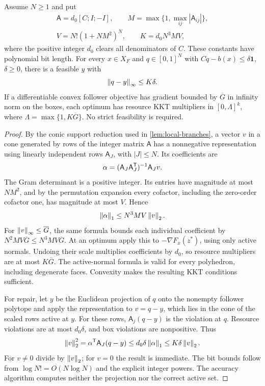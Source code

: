\begin{lemma}
\label{lem:resource-constants}
Assume $N\ge1$ and put
\begin{equation}\label{eq:integer-repair-constants}
 \begin{gathered}
 \mathsf A=d_0[C;I;-I],\qquad
 M=\max\{1,\max_{ij}|\mathsf A_{ij}|\},\\
 V=N!(1+NM^2)^N,\qquad K=d_0N^3MV,
 \end{gathered}
\end{equation}
where the positive integer $d_0$ clears all denominators of $C$.
These constants have polynomial bit length. For every $x\in X_F$
and $q\in[0,1]^N$ with $Cq-b(x)\le\delta\mathbf1$, $\delta\ge0$,
there is a feasible $y$ with
\begin{equation}\label{eq:resource-repair}
                         \left\lVert q-y\right\rVert_\infty\le K\delta.
\end{equation}
If a differentiable convex follower objective has gradient bounded by
$\overline G$ in infinity norm on the boxes, each optimum has resource
KKT multipliers in $[0,\Lambda]^k$, where
$\Lambda=\max\{1,K\overline G\}$. No strict feasibility is required.
\end{lemma}
\begin{proof}
By the conic support reduction used in \cref{lem:local-branches}, a
vector $v$ in a cone generated by rows of the integer matrix $\mathsf A$
has a nonnegative representation using linearly independent rows
$\mathsf A_J$, with $|J|\le N$. Its coefficients are
\[
 \alpha=(\mathsf A_J\mathsf A_J^{\mathsf T})^{-1}\mathsf A_Jv.
\]
The Gram determinant is a positive integer. Its entries have magnitude at
most $NM^2$, and by the permutation expansion every cofactor, including the
zero-order cofactor one, has magnitude at most $V$. Hence
\[
 \left\lVert\alpha\right\rVert_1\le N^3MV\left\lVert v\right\rVert_2.
\]
For $\left\lVert v\right\rVert_\infty\le\overline G$, the same formula bounds each
individual coefficient by $N^2MV\overline G\le N^3MV\overline G$.
At an optimum apply this to $-\nabla F_x(z^*)$, using only active
normals. Undoing their scale multiplies coefficients by $d_0$, so
resource multipliers are at most $K\overline G$. The active-normal
formula is valid for every polyhedron, including degenerate faces.
Convexity makes the resulting KKT conditions sufficient.

For repair, let $y$ be the Euclidean projection of $q$ onto the
nonempty follower polytope and apply the representation to $v=q-y$, which
lies in the cone of the scaled rows active at $y$. For these rows,
$\mathsf A_j(q-y)$ is the violation at $q$. Resource violations are at
most $d_0\delta$, and box violations are nonpositive. Thus
\[
 \left\lVert v\right\rVert_2^2=\alpha^{\mathsf T}\mathsf A_J(q-y)
 \le d_0\delta\left\lVert\alpha\right\rVert_1\le K\delta\left\lVert v\right\rVert_2.
\]
For $v\ne0$ divide by $\left\lVert v\right\rVert_2$; for $v=0$ the result is immediate.
The bit bounds follow from $\log N!=O(N\log N)$ and the explicit
integer powers. The accuracy algorithm computes neither the projection nor
the correct active set.
\end{proof}

